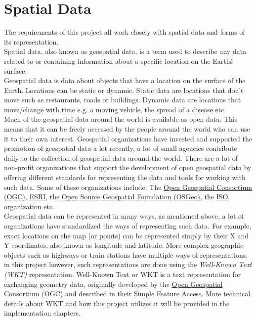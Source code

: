 \newpage
\section{Spatial Data}
The requirements of this project all work closely with spatial data and forms of its representation.\\
\newline
Spatial data, also known as geospatial data, is a term used to describe any data related to or containing information
about a specific location on the Earth\'s surface. \cite{AboutGeoSpatialData}\\
\newline
Geospatial data is data about objects that have a location on the surface of the Earth.
Locations can be static or dynamic. Static data are locations that don't move such as restaurants, roads or buildings.
Dynamic data are locations that move/change with time e.g. a moving vehicle, the spread of a disease etc.\\
\newline
Much of the geospatial data around the world is available as open data. This means that it can be freely accessed by the people
around the world who can use it to their own interest. Geospatial organizations have invested and supported the promotion of
geospatial data a lot recently, a lot of small agencies contribute daily to the collection of geospatial data around the world.
There are a lot of non-profit organizations that support the development of open geospatial data by offering different standards
for representing the data and tools for working with such data. Some of these organizations include: The \href{https://www.ogc.org/}{Open Geospatial Consortium (OGC)},
\href{https://www.esri.com/en-us/home}{ESRI}, the \href{https://www.osgeo.org/}{Open Source Geospatial Foundation (OSGeo)},
the \href{https://www.iso.org/home.html}{ISO organization} etc.\\
\newline
Geospatial data can be represented in many ways, as mentioned above, a lot of organizations have standardized the ways of representing
such data. For example, exact locations on the map (or points) can be represented simply by their X and Y coordinates, also known as longitude and latitude.
More complex geographic objects such as highways or train stations have multiple ways of representations, in this project however, such representations
are done using the \textit{Well-Known Text (WKT)} representation. Well-Known Text or WKT is a text representation for exchanging geometry data, originally developed by
the \href{https://www.ogc.org/}{Open Geospatial Consortium (OGC)} and described in their \href{https://www.ogc.org/standards/sfa#overview}{Simple Feature Access}.
More technical details about WKT and how this project utilizes it will be provided in the implementation chapters.\\
\newline
\newpage

